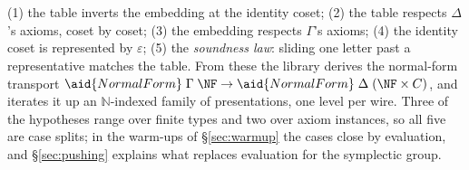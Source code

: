 \begin{code}
\AgdaSpace{}%
\AgdaSpace{}%
\AgdaSymbol{(}\AgdaSpace{}%
\AgdaSymbol{)}\AgdaSpace{}%
\AgdaSymbol{)}%
\>[84]\<%
\\
%
\>[2]\AgdaSymbol{(}\AgdaSpace{}%
\AgdaSymbol{:}\AgdaSpace{}%
\AgdaOperator{\AgdaPostulate{[}}\AgdaSpace{}%
\AgdaSpace{}%
\AgdaOperator{\AgdaPostulate{]}}\AgdaSpace{}%
\AgdaSpace{}%
\AgdaSymbol{)}%
\>[84]\<%
\\
%
\>[2]\AgdaSymbol{(}\AgdaSpace{}%
\AgdaSymbol{:}\AgdaSpace{}%
\AgdaSpace{}%
\AgdaSpace{}%
\AgdaSpace{}%
\AgdaSpace{}%
\AgdaSpace{}%
\AgdaSymbol{(}\AgdaSpace{}%
\AgdaOperator{\AgdaInductiveConstructor{,}}\AgdaSpace{}%
\AgdaSymbol{)}\AgdaSpace{}%
\AgdaSymbol{=}\AgdaSpace{}%
\AgdaSpace{}%
\AgdaSpace{}%
\AgdaSpace{}%
\AgdaSpace{}%
\AgdaOperator{\AgdaPostulate{[}}\AgdaSpace{}%
\AgdaSpace{}%
\AgdaOperator{\AgdaPostulate{]}}\AgdaSpace{}%
\AgdaSpace{}%
\AgdaOperator{\AgdaInductiveConstructor{[}}\AgdaSpace{}%
\AgdaSpace{}%
\AgdaOperator{\AgdaInductiveConstructor{]ʷ}}\AgdaSpace{}%
\AgdaSpace{}%
\AgdaSymbol{(}\AgdaSpace{}%
\AgdaSymbol{)}\AgdaSpace{}%
\AgdaSpace{}%
\AgdaSpace{}%
\AgdaOperator{\AgdaPostulate{[}}\AgdaSpace{}%
\AgdaSpace{}%
\AgdaOperator{\AgdaPostulate{]}}\AgdaSymbol{)}%
\>[84]\<%
\end{code}
\endgroup
\begin{code}[hide]%
%
\>[2]\<%
\end{code}

\noindent (1) the table inverts the embedding at the identity coset;
(2) the table respects $\Delta$'s axioms, coset by coset; (3) the
embedding respects $\Gamma$'s axioms; (4) the identity coset is
represented by $\varepsilon$; (5) the \emph{soundness law}: sliding one
letter past a representative matches the table.  From these the library
derives the normal-form transport $\aid{NormalForm}\;\Gamma\;\NF \to
\aid{NormalForm}\;\Delta\;(\NF \times C)$, and 
iterates it up an $\mathbb{N}$-indexed family of presentations, one
level per wire.  Three of the hypotheses range over finite types and
two over axiom instances, so all five are case splits; in the warm-ups
of \S\ref{sec:warmup} the cases close by evaluation, and
\S\ref{sec:pushing} explains what replaces evaluation for the
symplectic group.

